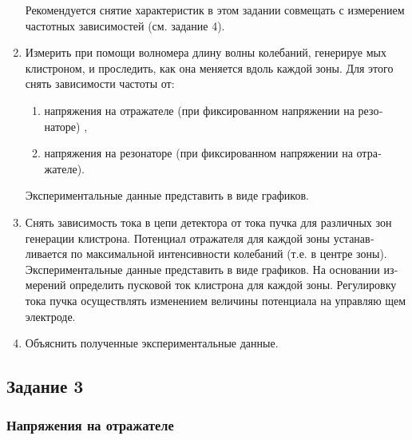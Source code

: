\begin{enumerate}
	Рекомендуется снятие характеристик в этом задании совмещать с изме­рением частотных зависимостей (см. задание 4).

	\item Измерить при помощи волномера длину волны колебаний, генерируе­
	мых клистроном, и проследить, как она меняется вдоль каждой зоны. Для
	этого снять зависимости частоты от:
		\begin{enumerate}
			\item  напряжения на отражателе (при фиксированном напряжении на резо­
			наторе) ,
			\item  напряжения на резонаторе (при фиксированном напряжении на отра­
			жателе).
		\end{enumerate}
	
	Экспериментальные данные представить в виде графиков.

	\item  Снять зависимость тока в цепи детектора от тока пучка для различных
	зон генерации клистрона. Потенциал отражателя для каждой зоны устанав­
	ливается по максимальной интенсивности колебаний (т.е. в центре зоны).
	Экспериментальные данные представить в виде графиков. На основании из­
	мерений определить пусковой ток клистрона для каждой зоны. Регулировку
	тока пучка осуществлять изменением величины потенциала на управляю­
	щем электроде.

	\item  Объяснить полученные экспериментальные данные.

\end{enumerate}

\subsection{Задание 3}
\subsubsection{Напряжения на отражателе}

